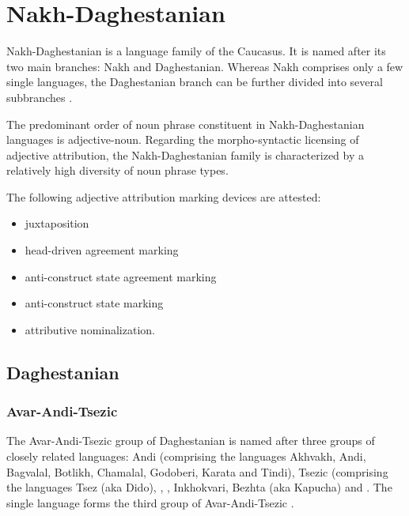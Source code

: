 \section{Nakh-Daghestanian}
Nakh-Daghestanian is a language family of the Caucasus. It is named after its two main branches: Nakh and Daghestanian. Whereas Nakh comprises only a few single languages, the Daghestanian branch can be further divided into several subbranches \citep[220, 233]{salminen2007}.

The predominant order of noun phrase constituent in Nakh-Daghestanian languages is adjective-noun. Regarding the morpho-syntactic licensing of adjective attribution, the Nakh-Daghestanian family is characterized by a relatively high diversity of noun phrase types.

The following adjective attribution marking devices are attested:
\begin{itemize}
\item juxtaposition
\item head\hyp{}driven agreement marking
\item anti\hyp{}construct state agreement marking
\item anti\hyp{}construct state marking
\item attributive nominalization.
\end{itemize}

\subsection{Daghestanian}
\subsubsection{Avar-Andi-Tsezic}
The Avar-Andi-Tsezic group of Daghestanian is named after three groups of closely related languages: Andi (comprising the languages Akhvakh, Andi, Bagvalal, Botlikh, Chamalal, Godoberi, Karata and Tindi), Tsezic (comprising the languages Tsez (aka Dido), , , Inkhokvari, Bezhta (aka Kapucha) and . The single language  forms the third group of Avar-Andi-Tsezic \citep[220, 233]{salminen2007}.


